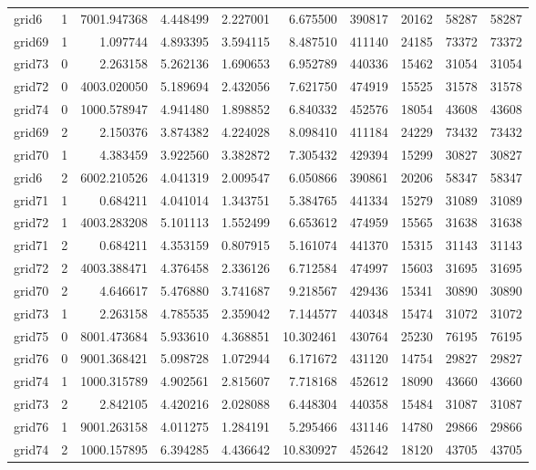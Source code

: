 \begin{longtable}{|l|r|r|r|r|r|r|r|r|r|}
grid6 & 1 & 7001.947368 & 4.448499 & 2.227001 & 6.675500 & 390817 & 20162 & 58287 & 58287 \\
grid69 & 1 & 1.097744 & 4.893395 & 3.594115 & 8.487510 & 411140 & 24185 & 73372 & 73372 \\
grid73 & 0 & 2.263158 & 5.262136 & 1.690653 & 6.952789 & 440336 & 15462 & 31054 & 31054 \\
grid72 & 0 & 4003.020050 & 5.189694 & 2.432056 & 7.621750 & 474919 & 15525 & 31578 & 31578 \\
grid74 & 0 & 1000.578947 & 4.941480 & 1.898852 & 6.840332 & 452576 & 18054 & 43608 & 43608 \\
grid69 & 2 & 2.150376 & 3.874382 & 4.224028 & 8.098410 & 411184 & 24229 & 73432 & 73432 \\
grid70 & 1 & 4.383459 & 3.922560 & 3.382872 & 7.305432 & 429394 & 15299 & 30827 & 30827 \\
grid6 & 2 & 6002.210526 & 4.041319 & 2.009547 & 6.050866 & 390861 & 20206 & 58347 & 58347 \\
grid71 & 1 & 0.684211 & 4.041014 & 1.343751 & 5.384765 & 441334 & 15279 & 31089 & 31089 \\
grid72 & 1 & 4003.283208 & 5.101113 & 1.552499 & 6.653612 & 474959 & 15565 & 31638 & 31638 \\
grid71 & 2 & 0.684211 & 4.353159 & 0.807915 & 5.161074 & 441370 & 15315 & 31143 & 31143 \\
grid72 & 2 & 4003.388471 & 4.376458 & 2.336126 & 6.712584 & 474997 & 15603 & 31695 & 31695 \\
grid70 & 2 & 4.646617 & 5.476880 & 3.741687 & 9.218567 & 429436 & 15341 & 30890 & 30890 \\
grid73 & 1 & 2.263158 & 4.785535 & 2.359042 & 7.144577 & 440348 & 15474 & 31072 & 31072 \\
grid75 & 0 & 8001.473684 & 5.933610 & 4.368851 & 10.302461 & 430764 & 25230 & 76195 & 76195 \\
grid76 & 0 & 9001.368421 & 5.098728 & 1.072944 & 6.171672 & 431120 & 14754 & 29827 & 29827 \\
grid74 & 1 & 1000.315789 & 4.902561 & 2.815607 & 7.718168 & 452612 & 18090 & 43660 & 43660 \\
grid73 & 2 & 2.842105 & 4.420216 & 2.028088 & 6.448304 & 440358 & 15484 & 31087 & 31087 \\
grid76 & 1 & 9001.263158 & 4.011275 & 1.284191 & 5.295466 & 431146 & 14780 & 29866 & 29866 \\
grid74 & 2 & 1000.157895 & 6.394285 & 4.436642 & 10.830927 & 452642 & 18120 & 43705 & 43705 \\

\end{longtable}

